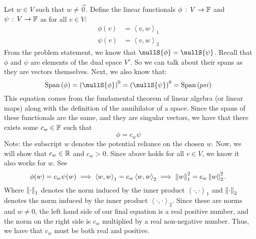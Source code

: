 \documentclass[answers]{exam}
\newcommand{\ip}[1]{\left\langle#1\right\rangle}
\newcommand{\spanS}[1]{\text{Span}\left(#1\right)}
\begin{document}
\begin{questions}
\begin{solution}
        Let $w\in V$ such that $w\neq\vec{0}$. Define the linear functionals 
        $\phi\,:\,V\rightarrow\mathbb{F}$ and $\psi\,:\,V\rightarrow\mathbb{F}$ as for all $v\in V$:
        \begin{align*}
            \phi(v) &= \ip{v,w}_1 \\
            \psi(v) &= \ip{v,w}_2
        \end{align*}
        From the problem statement, we know that $\nullS{\phi} = \nullS{\psi}$. Recall that $\phi$ and $\psi$
        are elements of the dual space $V'$. So we can talk about their spans as they are vectors themselves.
        Next, we also know that:
        \[
            \spanS{\phi} = \left(\nullS{\phi}\right)^0 = \left(\nullS{\psi}\right)^0 = \spanS{psi}
        \]
        This equation comes from the fundamental theorem of linear algebra (or linear maps) along with the 
        definition of the annihilator of a space. Since the spans of these functionals are the same, and they
        are singular vectors, we have that there exists some $c_w\in\mathbb{F}$ such that 
        \[
            \phi = c_w\psi
        \]
        Note: the subscript $w$ denotes the potential reliance on the chosen $w$.
        Now, we will show that $c_w\in\mathbb{R}$ and $c_w > 0$. Since above holds for all $v\in V$, we know it also works for $w$. See
        \[
            \phi(w) = c_w\psi(w) \implies \ip{w,w}_1 = c_w\ip{w,w}_2 \implies \norm{w}{1}^2 = c_w\norm{w}{2}^2.
        \]
        Where $\left\|\cdot\right\|_{1}$ denotes the norm induced by the inner product $\ip{\cdot,\cdot}_1$ and 
        $\left\|\cdot\right\|_{2}$ denotes the norm induced by the inner product $\ip{\cdot,\cdot}_2$. Since these
        are norms and $w\neq0$, the left hand side of our final equation is a real positive number, and 
        the norm on the right side is $c_w$ multiplied by a real non-negative number. Thus, we have that $c_w$
        must be both real and positive.


\end{solution}
\end{questions}
\end{document}
